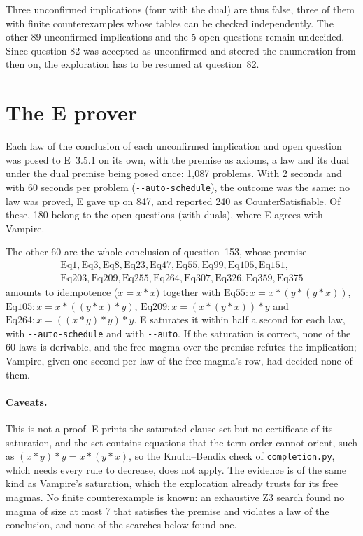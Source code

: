 \documentclass[11pt,a4paper]{article}
\newcommand{\code}[1]{\texttt{#1}}
\newcommand{\Eq}[1]{\mathrm{Eq}#1}
\begin{document}
Three unconfirmed implications (four with the dual) are thus false, three of them with finite
counterexamples whose tables can be checked independently. The other 89 unconfirmed implications
and the 5 open questions remain undecided. Since question 82 was accepted as unconfirmed and steered
the enumeration from then on, the exploration has to be resumed at question~82.

\section{The E prover}

Each law of the conclusion of each unconfirmed implication and open question was posed to
E~3.5.1 on its own, with the premise as axioms, a law and its dual under the dual premise being posed
once: 1,087 problems. With 2 seconds and with 60 seconds per problem (\code{-{}-auto-schedule}), the
outcome was the same: no law was proved, E gave up on 847, and reported 240 as CounterSatisfiable.
Of these, 180 belong to the open questions (with duals), where E agrees with Vampire.

The other 60 are the whole conclusion of question~153, whose premise
\begin{gather*}
\Eq{1}, \Eq{3}, \Eq{8}, \Eq{23}, \Eq{47}, \Eq{55}, \Eq{99}, \Eq{105}, \Eq{151},\\
\Eq{203}, \Eq{209}, \Eq{255}, \Eq{264}, \Eq{307}, \Eq{326}, \Eq{359}, \Eq{375}
\end{gather*}
amounts to idempotence ($x = x * x$) together with
$\Eq{55}\colon x = x * (y * (y * x))$, $\Eq{105}\colon x = x * ((y * x) * y)$,
$\Eq{209}\colon x = (x * (y * x)) * y$ and $\Eq{264}\colon x = ((x * y) * y) * y$.
E saturates it within half a second for each law, with \code{-{}-auto-schedule} and with
\code{-{}-auto}. If the saturation is correct, none of the 60 laws is derivable, and the free magma
over the premise refutes the implication; Vampire, given one second per law of the free magma's row,
had decided none of them.

\paragraph{Caveats.} This is not a proof. E prints the saturated clause set but no certificate of
its saturation, and the set contains equations that the term order cannot orient, such as
$(x * y) * y = x * (y * x)$, so the Knuth--Bendix check of \code{completion.py}, which needs every
rule to decrease, does not apply. The evidence is of the same kind as Vampire's saturation, which the
exploration already trusts for its free magmas. No finite counterexample is known: an exhaustive
Z3 search found no magma of size at most 7 that satisfies the premise and violates a law of the
conclusion, and none of the searches below found one.
\end{document}
